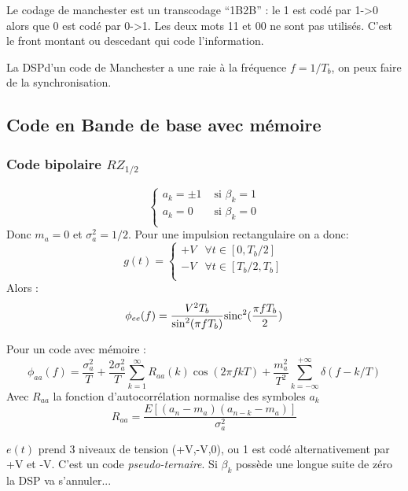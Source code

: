 \documentclass[main.tex]{subfiles}
\begin{document}
\begin{rem}
  Le codage de manchester est un transcodage ``1B2B'' : le 1 est
  codé par 1->0 alors que 0 est codé par 0->1. Les deux mots 11 et 00 ne
  sont pas utilisés. C'est le front montant ou descedant qui code l'information.

  La DSPd'un code de Manchester a une raie à la fréquence $f=1/T_b$,
  on peux faire de la synchronisation.
\end{rem}
\subsection{Code en Bande de base avec mémoire}
\subsubsection{Code bipolaire $RZ_{1/2}$}

\begin{defin}
  \[
    \begin{cases}
      a_k = \pm 1 & \text{ si } \beta_k =1 \\
      a_k = 0 & \text{ si } \beta_k =0 \\
    \end{cases}
  \]
 Donc $m_a =0$ et $\sigma_a^2 = 1/2$. 
  Pour une impulsion rectangulaire on a donc:
  \[
    g(t)=
    \begin{cases}
        + V & \forall t \in [0,T_b/2] \\
        -V  & \forall t \in [T_b/2,T_b]\\
    \end{cases}
  \]
  Alors :
  \[
    \phi_{ee}(f)= \frac{V^2T_b}{\sin^2(\pi fT_b)}\text{sinc}^2(\frac{\pi fT_b}{2})
  \]
\end{defin}
\begin{prop}
  Pour un code avec mémoire :
  \[
    \phi_{aa}(f) = \frac{\sigma_a^2}{T}+\frac{2\sigma_a^2}{T}\sum_{k=1}^{\infty}R_{aa}(k)\cos(2\pi fk T)+\frac{m_a^2}{T^2}\sum_{k=-\infty}^{+\infty}\delta(f-k/T)
  \]
  Avec $R_{aa}$ la fonction d'autocorrélation normalise des symboles
  $a_k$
  \[
    R_{aa}  = \frac{E[(a_n-m_a)(a_{n-k}-m_a)]}{\sigma_a^2}
  \]
\end{prop}

\begin{rem}
  $e(t)$ prend 3 niveaux de tension (+V,-V,0), ou 1 est codé
  alternativement par +V et -V. C'est un code
  \emph{pseudo-ternaire}. Si $\beta_k$ possède une longue suite de zéro la
  DSP va s'annuler...
\end{rem}
\end{document}
